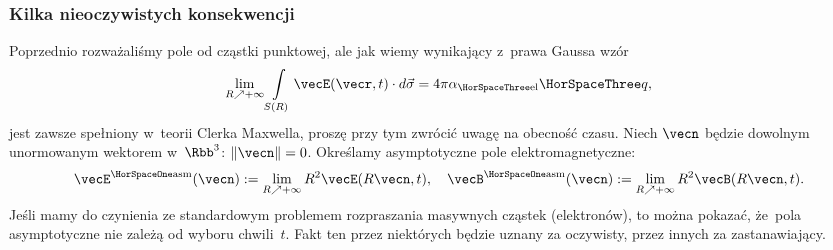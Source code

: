 \documentclass[10pt,t]{beamer}
\begin{document}
\begin{frame}
  \frametitle{Kilka nieoczywistych konsekwencji}


  Poprzednio rozważaliśmy pole od cząstki punktowej, ale jak wiemy
  wynikający z~prawa Gaussa wzór
  \begin{equation}
    \label{eq:Efekt-Casimira-01}
    \lim_{ R \nearrow +\infty } \int\limits_{ S( R ) } \vecE( \vecr, t ) \cdot d\vec{ \sigma } =
    4 \pi \alpha_{ \HorSpaceThree \text{el} } \HorSpaceThree q,
  \end{equation}
  jest zawsze spełniony w~teorii Clerka Maxwella, proszę przy tym zwrócić
  uwagę na obecność czasu. Niech $\vecn$ będzie dowolnym unormowanym
  wektorem w~$\Rbb^{ 3 }$: $\Vert \vecn \Vert = 0$. Określamy asymptotyczne pole
  elektromagnetyczne:
  \begin{equation}
    \label{eq:Efekt-Casimira-01}
    \vecE^{ \HorSpaceOne \text{asm} }( \vecn ) :=
    \lim_{ R \nearrow +\infty } R^{ 2 } \vecE( R \vecn, t ), \quad
    \vecB^{ \HorSpaceOne \text{asm} }( \vecn ) :=
    \lim_{ R \nearrow +\infty } R^{ 2 } \vecB( R \vecn, t ).
  \end{equation}
  Jeśli mamy do czynienia ze standardowym problemem rozpraszania masywnych
  cząstek (elektronów), to można pokazać, że~pola asymptotyczne nie zależą
  od wyboru chwili~$t$. Fakt ten przez niektórych będzie uznany za
  oczywisty, przez innych za zastanawiający.

\end{frame}
\end{document}
